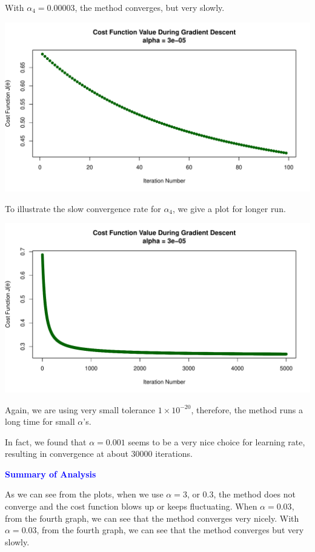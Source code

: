 \documentclass[a4paper,12pt]{article}
\begin{document}
With $\alpha_4 = 0.00003$, the method converges, but very slowly.
\begin{center}
    \includegraphics[width=0.9\linewidth]{Images/Prob3-5-alpha4-itr100.pdf}
\end{center}

To illustrate the slow convergence rate for $\alpha_4$, we give a plot for longer run.
\begin{center}
    \includegraphics[width=0.9\linewidth]{Images/Prob3-5-alpha4-itr5000.pdf}
\end{center}
Again, we are using very small tolerance $1\times 10^{-20}$, therefore, the method runs a long time for small $\alpha$'s.

In fact, we found that $\alpha = 0.001$ seems to be a very nice choice for learning rate, resulting in convergence at about 30000 iterations.
\bigskip\bigskip




\noindent\textcolor{blue}{\textbf{Summary of Analysis}}
\medskip

As we can see from the plots, when we use $\alpha = 3$, or $0.3$, the method does not converge and the cost function blows up or keeps fluctuating. When $\alpha=0.03$, from the fourth graph, we can see that the method converges very nicely. With $\alpha=0.03$, from the fourth graph, we can see that the method converges but very slowly.  
\end{document}
